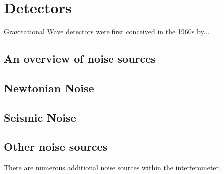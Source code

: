 \documentclass{kentigern}
\begin{document}


\chapter{Detectors}
\label{cha:detectors}


Gravitational Wave detectors were first conceived in the 1960s by...

\section{An overview of noise sources}
\label{sec:an-overview-noise}

\section{Newtonian Noise}
\label{sec:newtonian-noise}

\section{Seismic Noise}
\label{sec:seismic-noise}

\section{Other noise sources}
\label{sec:other-noise-sources}

There are numerous additional noise sources within the interferometer.

\glsaddall
{}
\printglossaries
\end{document}
